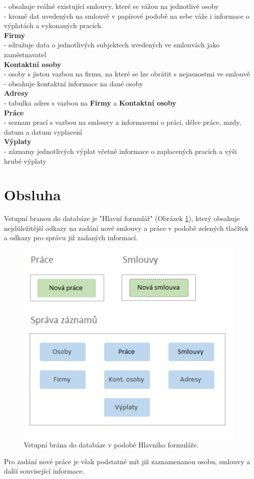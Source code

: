 \documentclass{article}
\begin{document}
	- obsahuje reálné existující smlouvy, které se vážou na jednotlivé osoby\\
	- kromě dat uvedených na smlouvě v papírové podobě na sebe váže i informace o výplatách a vykonaných pracích.\\
	\textbf{Firmy}\\
	- sdružuje data o jednotlivých subjektech uvedených ve smlouvách jako zaměstnavatel\\
	\textbf{Kontaktní osoby}\\
	- osoby s jistou vazbou na firmu, na které se lze obrátit s nejasnostmi ve smlouvě\\
	- obsahuje kontaktní informace na dané osoby\\
	\textbf{Adresy}\\
	- tabulka adres s vazbou na \textbf{Firmy} a \textbf{Kontaktní osoby}\\
	\textbf{Práce}\\
	- seznam prací s vazbou na smlouvy a informacemi o práci, délce práce, mzdy, datum a datum vyplacení\\
	\textbf{Výplaty}\\
	- záznamy jednotlivých výplat včetně informace o zaplacených pracích a výši hrubé výplaty\\
	
	\section{Obsluha}
	Vstupní branou do databáze je "Hlavní formulář" (Obrázek \ref{pic:hlavni_formular}), který obsahuje nejdůležitější odkazy na zadání nové smlouvy a práce v podobě zelených tlačítek a odkazy pro správu již zadaných informací.
	
	\begin{figure}[H]
		\centering
		\includegraphics[width=.5\textwidth]{./Graphics/hlavni_formular}
		\caption{Vstupní brána do databáze v podobě Hlavního formuláře.}
		\label{pic:hlavni_formular}
	\end{figure}
	Pro zadání nové práce je však podstatné mít již zaznamenanou osobu, smlouvy a další související informace.
	
\end{document}
